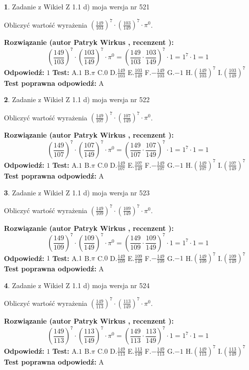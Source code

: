 \documentclass[12pt, a4paper]{article}
\theoremstyle{definition} %
\newtheorem{zad}{}
\newcommand{\zadStart}[1]{\begin{zad}#1\newline}
\newcommand{\zadStop}{\end{zad}}
\newcommand{\rozwStart}[2]{\noindent \textbf{Rozwiązanie (autor #1 , recenzent #2): }\newline}
\newcommand{\rozwStop}{\newline}
\newcommand{\odpStart}{\noindent \textbf{Odpowiedź:}\newline}
\newcommand{\odpStop}{\newline}
\newcommand{\testStart}{\noindent \textbf{Test:}\newline}
\newcommand{\testStop}{\newline}
\newcommand{\kluczStart}{\noindent \textbf{Test poprawna odpowiedź:}\newline}
\newcommand{\kluczStop}{\newline}
\begin{document}
\zadStart{Zadanie z Wikieł Z 1.1 d) moja wersja nr 521}

Obliczyć wartość wyrażenia $(\frac{149}{103})^{7} \cdot (\frac{103}{149})^{7} \cdot \pi^{0}$.
\zadStop
\rozwStart{Patryk Wirkus}{}
$$(\frac{149}{103})^{7} \cdot (\frac{103}{149})^{7} \cdot \pi^{0} = (\frac{149}{103} \cdot \frac{103}{149})^{7} \cdot 1 = 1^{7} \cdot 1 = 1$$
\rozwStop
\odpStart
$1$
\odpStop
\testStart
A.$1$ B.$\pi$ C.$0$ D.$\frac{149}{103}$ E.$\frac{103}{149}$
F.$-\frac{149}{103}$ G.$-1$
H.$(\frac{149}{103})^{7}$
I.$(\frac{103}{149})^{7}$
\testStop
\kluczStart
A
\kluczStop



\zadStart{Zadanie z Wikieł Z 1.1 d) moja wersja nr 522}

Obliczyć wartość wyrażenia $(\frac{149}{107})^{7} \cdot (\frac{107}{149})^{7} \cdot \pi^{0}$.
\zadStop
\rozwStart{Patryk Wirkus}{}
$$(\frac{149}{107})^{7} \cdot (\frac{107}{149})^{7} \cdot \pi^{0} = (\frac{149}{107} \cdot \frac{107}{149})^{7} \cdot 1 = 1^{7} \cdot 1 = 1$$
\rozwStop
\odpStart
$1$
\odpStop
\testStart
A.$1$ B.$\pi$ C.$0$ D.$\frac{149}{107}$ E.$\frac{107}{149}$
F.$-\frac{149}{107}$ G.$-1$
H.$(\frac{149}{107})^{7}$
I.$(\frac{107}{149})^{7}$
\testStop
\kluczStart
A
\kluczStop



\zadStart{Zadanie z Wikieł Z 1.1 d) moja wersja nr 523}

Obliczyć wartość wyrażenia $(\frac{149}{109})^{7} \cdot (\frac{109}{149})^{7} \cdot \pi^{0}$.
\zadStop
\rozwStart{Patryk Wirkus}{}
$$(\frac{149}{109})^{7} \cdot (\frac{109}{149})^{7} \cdot \pi^{0} = (\frac{149}{109} \cdot \frac{109}{149})^{7} \cdot 1 = 1^{7} \cdot 1 = 1$$
\rozwStop
\odpStart
$1$
\odpStop
\testStart
A.$1$ B.$\pi$ C.$0$ D.$\frac{149}{109}$ E.$\frac{109}{149}$
F.$-\frac{149}{109}$ G.$-1$
H.$(\frac{149}{109})^{7}$
I.$(\frac{109}{149})^{7}$
\testStop
\kluczStart
A
\kluczStop



\zadStart{Zadanie z Wikieł Z 1.1 d) moja wersja nr 524}

Obliczyć wartość wyrażenia $(\frac{149}{113})^{7} \cdot (\frac{113}{149})^{7} \cdot \pi^{0}$.
\zadStop
\rozwStart{Patryk Wirkus}{}
$$(\frac{149}{113})^{7} \cdot (\frac{113}{149})^{7} \cdot \pi^{0} = (\frac{149}{113} \cdot \frac{113}{149})^{7} \cdot 1 = 1^{7} \cdot 1 = 1$$
\rozwStop
\odpStart
$1$
\odpStop
\testStart
A.$1$ B.$\pi$ C.$0$ D.$\frac{149}{113}$ E.$\frac{113}{149}$
F.$-\frac{149}{113}$ G.$-1$
H.$(\frac{149}{113})^{7}$
I.$(\frac{113}{149})^{7}$
\testStop
\kluczStart
A
\kluczStop
\end{document}
